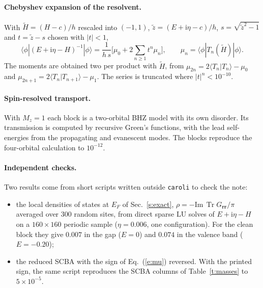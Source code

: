 \documentclass[11pt,a4paper]{article}
\newcommand{\I}{\mathrm{i}}
\newcommand{\Tr}{\operatorname{Tr}}
\begin{document}
\paragraph{Chebyshev expansion of the resolvent.} With $\tilde H=(H-c)/h$ rescaled into $(-1,1)$,
$\tilde z = (E+\I\eta-c)/h$, $s=\sqrt{\tilde z^2-1}$ and $t=\tilde z-s$ chosen with $|t|<1$,
\begin{equation}
\langle\phi|(E+\I\eta-H)^{-1}|\phi\rangle = \frac{1}{h\,s}\Big[\mu_0+2\sum_{n\ge1}t^n\mu_n\Big],\qquad
\mu_n = \langle\phi|T_n(\tilde H)|\phi\rangle .
\end{equation}
The moments are obtained two per product with $\tilde H$, from
$\mu_{2n}=2\langle T_n|T_n\rangle-\mu_0$ and $\mu_{2n+1}=2\langle T_n|T_{n+1}\rangle-\mu_1$. The series is
truncated where $|t|^n<10^{-10}$.

\paragraph{Spin-resolved transport.} With $M_z=1$ each block is a two-orbital BHZ model with its
own disorder. Its transmission is computed by recursive Green's functions, with the lead
self-energies from the propagating and evanescent modes. The blocks reproduce the four-orbital
calculation to $10^{-12}$.

\paragraph{Independent checks.} Two results come from short scripts written outside
\texttt{caroli} to check the note:
\begin{itemize}
\item the local densities of states at $E_F$ of Sec.~\ref{s:exact},
  $\rho=-\mathrm{Im}\,\Tr G_{\bm r\bm r}/\pi$ averaged over 300 random sites, from direct sparse LU
  solves of $E+\I\eta-H$ on a $160\times160$ periodic sample ($\eta=0.006$, one configuration). For
  the clean block they give $0.007$ in the gap ($E=0$) and $0.074$ in the valence band
  ($E=-0.20$);
\item the reduced SCBA with the sign of Eq.~(\ref{e:mu}) reversed. With the printed sign, the same
  script reproduces the SCBA columns of Table~\ref{t:masses} to $5\times10^{-5}$.
\end{itemize}
\end{document}
